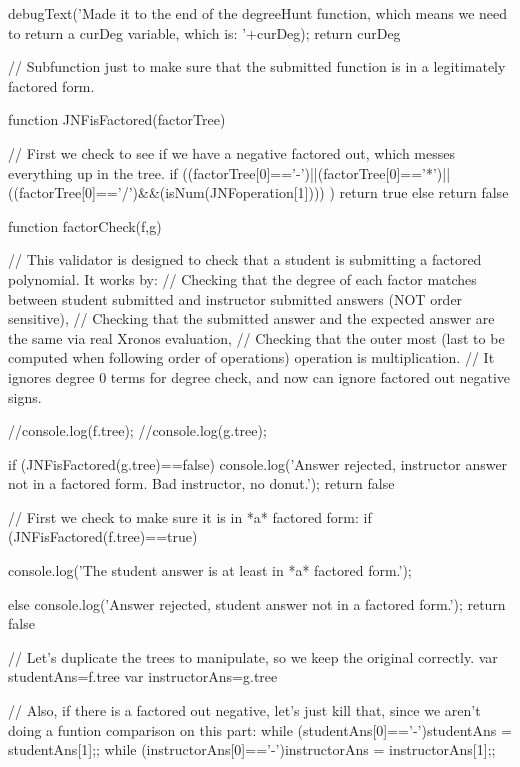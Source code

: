 \begin{javascript}
{{    }
    debugText('Made it to the end of the degreeHunt function, which means we need to return a curDeg variable, which is: '+curDeg);
    return curDeg
}

// Subfunction just to make sure that the submitted function is in a legitimately factored form.

function JNFisFactored(factorTree) {
   
    // First we check to see if we have a negative factored out, which messes everything up in the tree.
    if ((factorTree[0]=='-')||(factorTree[0]=='*')||((factorTree[0]=='/')&&(isNum(JNFoperation[1])))
    ) {return true} else {return false}
}


function factorCheck(f,g) {
    // This validator is designed to check that a student is submitting a factored polynomial. It works by:
    //  Checking that the degree of each factor matches between student submitted and instructor submitted answers (NOT order sensitive),
    //  Checking that the submitted answer and the expected answer are the same via real Xronos evaluation,
    //  Checking that the outer most (last to be computed when following order of operations) operation is multiplication.
    //  It ignores degree 0 terms for degree check, and now can ignore factored out negative signs.
    
    
    //console.log(f.tree);
    //console.log(g.tree);

    if (JNFisFactored(g.tree)==false) {
        console.log('Answer rejected, instructor answer not in a factored form. Bad instructor, no donut.');
        return false
    }
    
    // First we check to make sure it is in *a* factored form:
    if (JNFisFactored(f.tree)==true) {
        console.log('The student answer is at least in *a* factored form.');
        
        
    } else {
        console.log('Answer rejected, student answer not in a factored form.');
        return false
    }
    
    // Let's duplicate the trees to manipulate, so we keep the original correctly.
    var studentAns=f.tree
    var instructorAns=g.tree
    
    // Also, if there is a factored out negative, let's just kill that, since we aren't doing a funtion comparison on this part:
    while (studentAns[0]=='-'){studentAns = studentAns[1];};
    while (instructorAns[0]=='-'){instructorAns = instructorAns[1];};
    
}
\end{javascript}
